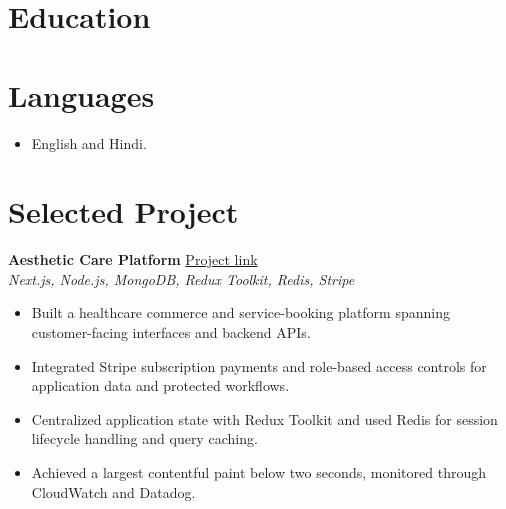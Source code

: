 \documentclass[11pt,a4paper,sans]{moderncv}
\begin{document}
\vspace{3pt}



\newpage
\section{Education}
\vspace{1pt}


\vspace{3pt}



\section{Languages}
\vspace{1pt}
\begin{itemize}
\item {English and Hindi.}
\end{itemize}


\section{Selected Project}
\vspace{1pt}
\textbf{Aesthetic Care Platform} \hfill \href{https://shahinahoja.com/}{Project link}\\
\textit{Next.js, Node.js, MongoDB, Redux Toolkit, Redis, Stripe}
\begin{itemize}
\item {Built a healthcare commerce and service-booking platform spanning customer-facing interfaces and backend APIs.}
\item {Integrated Stripe subscription payments and role-based access controls for application data and protected workflows.}
\item {Centralized application state with Redux Toolkit and used Redis for session lifecycle handling and query caching.}
\item {Achieved a largest contentful paint below two seconds, monitored through CloudWatch and Datadog.}
\end{itemize}
\end{document}
